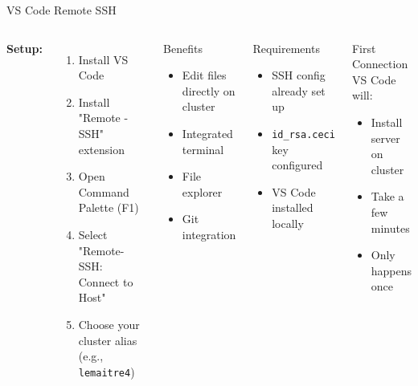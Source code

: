 \documentclass[aspectratio=169]{beamer}
\begin{document}
\begin{frame}{VS Code Remote SSH}
\begin{columns}[T]
\textbf{Setup:}
\begin{enumerate}
    \item Install VS Code
    \item Install "Remote - SSH" extension
    \item Open Command Palette (F1)
    \item Select "Remote-SSH: Connect to Host"
    \item Choose your cluster alias\\
    {\small (e.g., \texttt{lemaitre4})}
\end{enumerate}

\vspace{0.3em}
\begin{exampleblock}{Benefits}
\begin{itemize}
    \item Edit files directly on cluster
    \item Integrated terminal
    \item File explorer
    \item Git integration
\end{itemize}
\end{exampleblock}

\begin{block}{Requirements}
\begin{itemize}
    \item SSH config already set up
    \item \texttt{id\_rsa.ceci} key configured
    \item VS Code installed locally
\end{itemize}
\end{block}

\vspace{0.5em}
\begin{alertblock}{First Connection}
VS Code will:
\begin{itemize}
    \item Install server on cluster
    \item Take a few minutes
    \item Only happens once
\end{itemize}
\end{alertblock}

\end{columns}
\end{frame}
\end{document}
